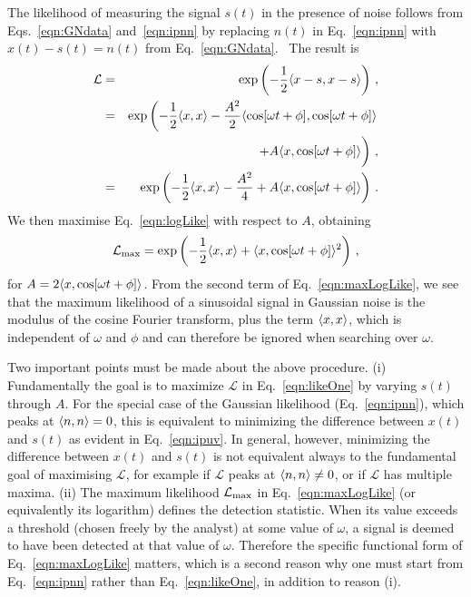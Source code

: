 \documentclass[paper-main.tex]{subfiles}
\begin{document}
The likelihood of measuring the signal $s(t)$ in the presence of noise follows from Eqs.~\ref{eqn:GNdata} and~\ref{eqn:ipnn} by replacing $n(t)$ in Eq.~\ref{eqn:ipnn} with $x(t) - s(t) = n(t)$ from Eq.~\ref{eqn:GNdata}.~\cite{JKS:1998,Jaynes:2003}
The result is
\begin{eqnarray}
\mathcal{L} &=& \exp\left( -\frac{1}{2}\langle x-s,x-s \rangle \right) \label{eqn:likeOne}\,, \\ 
            &=& \exp\left( -\frac{1}{2}\langle x,x \rangle - \frac{A^2}{2} \langle \cos[\omega t + \phi],\cos[\omega t + \phi] \rangle \right. \nonumber\\
                 &&\hspace{3em} \left. +  A \langle x,\cos[\omega t + \phi] \rangle \vphantom{\frac12}\right) \,,\\ 
                 &=& \exp \left( -\frac{1}{2}\langle x,x \rangle - \frac{A^2}{4} + A \langle x,\cos[\omega t + \phi] \rangle \right)\,.\label{eqn:logLike}
\end{eqnarray}
We then maximise Eq.~\ref{eqn:logLike} with respect to $A$, obtaining 
\begin{eqnarray}
\label{eqn:maxLogLike}
\mathcal{L}_\mathrm{max} = \exp \left( - \frac{1}{2} \langle x,x \rangle + \langle x,\cos[\omega t + \phi] \rangle^2 \right)\,,
\end{eqnarray}
for $A = 2\langle x,\cos[\omega t + \phi] \rangle$.
From the second term of Eq.~\ref{eqn:maxLogLike}, we see that the maximum likelihood of a sinusoidal signal in Gaussian noise is the modulus of the cosine Fourier transform, plus the term $\langle x,x \rangle$, which is independent of $\omega$ and $\phi$ and can therefore be ignored when searching over $\omega$.


Two important points must be made about the above procedure. 
(i) Fundamentally the goal is to maximize $\mathcal{L}$ in Eq.~\ref{eqn:likeOne} by varying $s(t)$ through $A$.
For the special case of the Gaussian likelihood (Eq.~\ref{eqn:ipnn}), which peaks at $\langle n,n \rangle= 0$, this is equivalent to minimizing the difference between $x(t)$ and $s(t)$ as evident in Eq.~\ref{eqn:ipuv}.
In general, however, minimizing the difference between $x(t)$ and $s(t)$ is not equivalent always to the fundamental goal of maximising $\mathcal{L}$, for example if $\mathcal{L}$ peaks at $\langle n,n \rangle \neq 0$, or if $\mathcal{L}$ has multiple maxima.
(ii) The maximum likelihood $\mathcal{L}_{\rm max}$ in Eq.~\ref{eqn:maxLogLike} (or equivalently its logarithm) defines the detection statistic. 
When its value exceeds a threshold (chosen freely by the analyst) at some value of $\omega$, a signal is deemed to have been detected at that value of $\omega$.
Therefore the specific functional form of Eq.~\ref{eqn:maxLogLike} matters, which is a second reason why one must start from Eq.~\ref{eqn:ipnn} rather than Eq.~\ref{eqn:likeOne}, in addition to reason (i).
\end{document}
